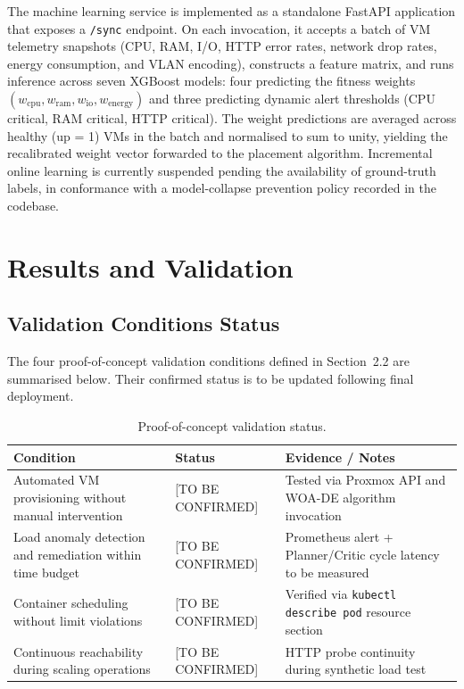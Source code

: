 \documentclass[12pt,a4paper]{report}
\begin{document}
The machine learning service is implemented as a standalone FastAPI application that
exposes a \texttt{/sync} endpoint. On each invocation, it accepts a batch of VM
telemetry snapshots (CPU, RAM, I/O, HTTP error rates, network drop rates, energy
consumption, and VLAN encoding), constructs a feature matrix, and runs inference
across seven XGBoost models: four predicting the fitness weights
$(w_{\text{cpu}}, w_{\text{ram}}, w_{\text{io}}, w_{\text{energy}})$ and three
predicting dynamic alert thresholds (CPU critical, RAM critical, HTTP critical).
The weight predictions are averaged across healthy (up = 1) VMs in the batch and
normalised to sum to unity, yielding the recalibrated weight vector forwarded to
the placement algorithm. Incremental online learning is currently suspended pending
the availability of ground-truth labels, in conformance with a model-collapse
prevention policy recorded in the codebase.

\section{Results and Validation}

\subsection{Validation Conditions Status}

The four proof-of-concept validation conditions defined in Section~2.2 are
summarised below. Their confirmed status is to be updated following final
deployment.

\begin{table}[htbp]
\centering
\caption{Proof-of-concept validation status.}
\label{tab:poc_status}
\begin{tabular}{L{5cm} C{2.5cm} L{5.5cm}}
\toprule
\textbf{Condition} & \textbf{Status} & \textbf{Evidence / Notes} \\
\midrule
Automated VM provisioning without manual intervention & [TO BE CONFIRMED] & Tested via Proxmox API and WOA-DE algorithm invocation \\
Load anomaly detection and remediation within time budget & [TO BE CONFIRMED] & Prometheus alert + Planner/Critic cycle latency to be measured \\
Container scheduling without limit violations & [TO BE CONFIRMED] & Verified via \texttt{kubectl describe pod} resource section \\
Continuous reachability during scaling operations & [TO BE CONFIRMED] & HTTP probe continuity during synthetic load test \\
\bottomrule
\end{tabular}
\end{table}
\end{document}
